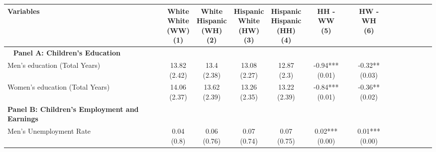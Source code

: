 \begin{landscape}
\begin{ThreePartTable}
\begin{longtable}[t]{>{\raggedright\arraybackslash}p{5cm}cccccc}
Variables & \specialcell{White \\ White \\ (WW) \\ (1)} & \specialcell{White \\ Hispanic \\ (WH) \\ (2)} & \specialcell{Hispanic \\ White \\ (HW) \\ (3)} & \specialcell{Hispanic \\ Hispanic \\ (HH) \\ (4)} & \specialcell{HH - WW \\ (5)} & \specialcell{HW - WH \\ (6)}\\
\midrule
\endhead
\midrule
\multicolumn{7}{r@{}}{\textit{(Continued on Next Page...)}}\
\endfoot
\bottomrule
\insertTableNotes
\endlastfoot
\textbf{Panel A: Children's Education} & \textbf{} & \textbf{} & \textbf{} & \textbf{} & \textbf{} & \textbf{}\\
\hspace{1em}Men’s education (Total Years) & \specialcell{13.82\\(2.42)} & \specialcell{13.4\\(2.38)} & \specialcell{13.08\\(2.27)} & \specialcell{12.87\\(2.3)} & \specialcell{-0.94***\\(0.01)} & \specialcell{-0.32**\\(0.03)}\\
\hspace{1em}Women’s education (Total Years) & \specialcell{14.06\\(2.37)} & \specialcell{13.62\\(2.39)} & \specialcell{13.26\\(2.35)} & \specialcell{13.22\\(2.39)} & \specialcell{-0.84***\\(0.01)} & \specialcell{-0.36**\\(0.02)}\\
\textbf{Panel B: Children's Employment and Earnings} & \textbf{} & \textbf{} & \textbf{} & \textbf{} & \textbf{} & \textbf{}\\
\hspace{1em}Men’s Unemployment Rate & \specialcell{0.04\\(0.8)} & \specialcell{0.06\\(0.76)} & \specialcell{0.07\\(0.74)} & \specialcell{0.07\\(0.75)} & \specialcell{0.02***\\(0.00)} & \specialcell{0.01***\\(0.00)}\\

\end{longtable}
\end{ThreePartTable}
\end{landscape}
